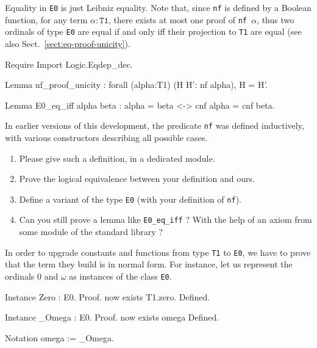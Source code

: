Equality in \texttt{E0} is just Leibniz equality. Note that, since \texttt{nf} is
defined by a Boolean function, for  any term $\alpha:\texttt{T1}$, there exists at most one proof of \texttt{nf $\alpha$}, thus two ordinals of type \texttt{E0} are
equal if and only iff their projection to \texttt{T1} are equal (see also Sect.~\vref{sect:eq-proof-unicity}).



\begin{Coqsrc}
Require Import Logic.Eqdep_dec.

Lemma nf_proof_unicity :
  forall (alpha:T1) (H H': nf alpha), H = H'.

Lemma E0_eq_iff alpha beta : alpha = beta <-> cnf alpha = cnf beta.
\end{Coqsrc}

\begin{exercise}
In earlier versions of this development, the predicate \texttt{nf} was defined  inductively, with various constructors describing all possible cases.
\begin{enumerate}
\item Please give such a definition, in a dedicated module.
\item Prove the logical equivalence between your definition and ours.
\item Define a variant of the type \texttt{E0} (with your definition of \texttt{nf}).
\item Can you still prove a lemma like \texttt{E0\_eq\_iff} ? With the help of an axiom from some module of the standard library ?
\end{enumerate}
\end{exercise}


In order to  upgrade constants and functions from type \texttt{T1} to \texttt{E0}, we have to prove that
the term they build is in normal form.
For instance, let us represent the ordinals $0$ and $\omega$ as instances of the class \texttt{E0}.

\label{sect:omega-T1}

\begin{Coqsrc}
Instance Zero : E0.
Proof.
  now exists T1.zero.
Defined.

Instance _Omega : E0.
Proof.  now exists omega%
Defined.

Notation omega  := _Omega.
\end{Coqsrc}



